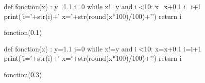 \begin{minipage}{0.5\textwidth}
\question{}

\begin{pycode}
def fonction(x) :
    y=1.1
    i=0
    while x!=y and i <10:
        x=x+0.1
        i=i+1
        print('i='+str(i)+' x='+str(round(x*100)/100)+'\n')
    return i

fonction(0.1)
\end{pycode}
\end{minipage}
\begin{minipage}{0.5\textwidth}
\question{}

\begin{pycode}
def fonction(x) :
    y=1.1
    i=0
    while x!=y and i <10:
        x=x+0.1
        i=i+1
        print('i='+str(i)+' x='+str(round(x*100)/100)+'\n')
    return i

fonction(0.3)
\end{pycode}
\end{minipage}




